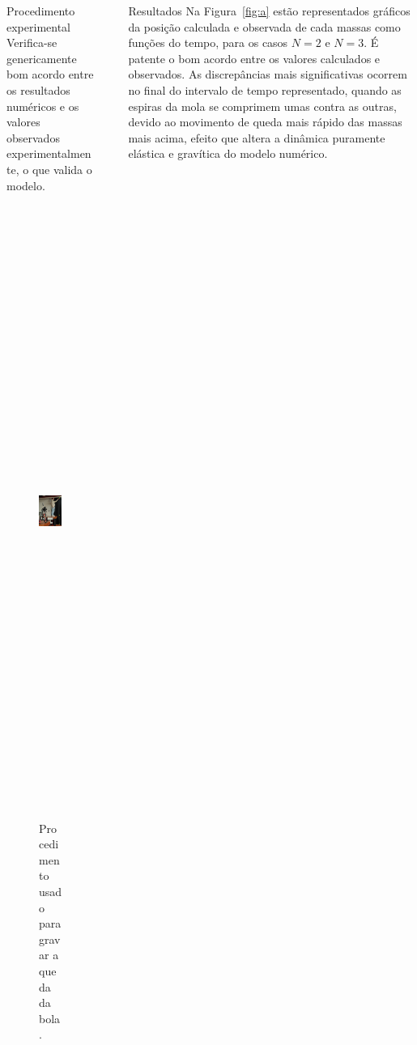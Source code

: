 \documentclass[final]{beamer}
\newlength{\sepwidth}
\newlength{\colwidth}
\newcommand{\separatorcolumn}{\begin{column}{\sepwidth}\end{column}}
\begin{document}
\begin{frame}[t]
\begin{columns}[t]
\begin{column}{\colwidth}
\begin{block}{Procedimento experimental}
Verifica-se genericamente bom acordo entre os resultados numéricos e os valores
observados experimentalmente, o que valida o modelo.
\vspace{2cm}
\begin{center}
\begin{figure}
\includegraphics[height=20cm]{images/Final.jpg}
\caption{Procedimento usado para gravar a queda da bola.}
\end{figure}
\end{center}
\end{block}
\end{column}

\separatorcolumn
\begin{column}{\colwidth}
\begin{block}{Resultados}
Na Figura~\ref{fig:a}  estão representados gráficos da posição calculada e
observada de cada massas como funções do tempo, para os casos $N=2$ e $N=3$. É
patente o bom acordo entre os valores calculados e observados. As discrepâncias
mais significativas ocorrem no final do intervalo de tempo representado, quando
as espiras da mola se comprimem umas contra as outras, devido ao movimento de
queda mais rápido das massas mais acima, efeito que altera a dinâmica puramente
elástica e gravítica do modelo numérico.


\end{block}
\end{column}
\end{columns}
\end{frame}
\end{document}
